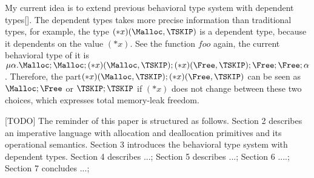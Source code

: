 My current idea is to extend previous behavioral type system with
dependent types[]. The dependent types takes more precise information
than traditional types, for example, the type
\((*x)(\Malloc, \TSKIP)\) is a dependent type, because it dependents
on the value \((*x)\). See the function \(foo\) again, the current
behavioral type of it is \(
\mu\alpha.\Malloc;\Malloc;(*x)(\Malloc, \TSKIP);(*x)(\Free, \TSKIP);\Free;\Free;\alpha
\). Therefore, the part\((*x)(\Malloc, \TSKIP);(*x)(\Free, \TSKIP)\)
can be seen as \(\Malloc;\Free\) or \(\TSKIP;\TSKIP\) if \((*x)\) does
not change between these two choices, which expresses total
memory-leak freedom.

[TODO] The reminder of this paper is structured as follows. Section 2
describes an imperative language with allocation and deallocation
primitives and its operational semantics. Section 3 introduces the
behavioral type system with dependent types. Section 4 describes ...;
Section 5 describes ...; Section 6 ....; Section 7 concludes ...;
